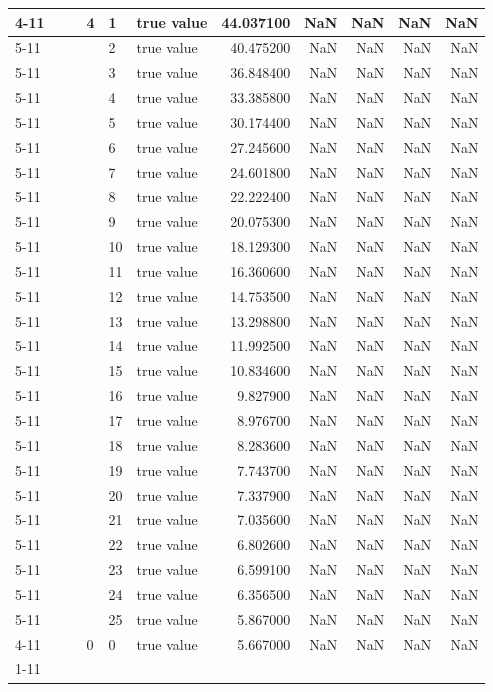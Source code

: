 \begin{tabular}{llllllrrrrr}
\cline{4-11} \cline{5-11}
 &  &  & \multirow[t]{25}{*}{4} & 1 & true value & 44.037100 & NaN & NaN & NaN & NaN \\
\cline{5-11}
 &  &  &  & 2 & true value & 40.475200 & NaN & NaN & NaN & NaN \\
\cline{5-11}
 &  &  &  & 3 & true value & 36.848400 & NaN & NaN & NaN & NaN \\
\cline{5-11}
 &  &  &  & 4 & true value & 33.385800 & NaN & NaN & NaN & NaN \\
\cline{5-11}
 &  &  &  & 5 & true value & 30.174400 & NaN & NaN & NaN & NaN \\
\cline{5-11}
 &  &  &  & 6 & true value & 27.245600 & NaN & NaN & NaN & NaN \\
\cline{5-11}
 &  &  &  & 7 & true value & 24.601800 & NaN & NaN & NaN & NaN \\
\cline{5-11}
 &  &  &  & 8 & true value & 22.222400 & NaN & NaN & NaN & NaN \\
\cline{5-11}
 &  &  &  & 9 & true value & 20.075300 & NaN & NaN & NaN & NaN \\
\cline{5-11}
 &  &  &  & 10 & true value & 18.129300 & NaN & NaN & NaN & NaN \\
\cline{5-11}
 &  &  &  & 11 & true value & 16.360600 & NaN & NaN & NaN & NaN \\
\cline{5-11}
 &  &  &  & 12 & true value & 14.753500 & NaN & NaN & NaN & NaN \\
\cline{5-11}
 &  &  &  & 13 & true value & 13.298800 & NaN & NaN & NaN & NaN \\
\cline{5-11}
 &  &  &  & 14 & true value & 11.992500 & NaN & NaN & NaN & NaN \\
\cline{5-11}
 &  &  &  & 15 & true value & 10.834600 & NaN & NaN & NaN & NaN \\
\cline{5-11}
 &  &  &  & 16 & true value & 9.827900 & NaN & NaN & NaN & NaN \\
\cline{5-11}
 &  &  &  & 17 & true value & 8.976700 & NaN & NaN & NaN & NaN \\
\cline{5-11}
 &  &  &  & 18 & true value & 8.283600 & NaN & NaN & NaN & NaN \\
\cline{5-11}
 &  &  &  & 19 & true value & 7.743700 & NaN & NaN & NaN & NaN \\
\cline{5-11}
 &  &  &  & 20 & true value & 7.337900 & NaN & NaN & NaN & NaN \\
\cline{5-11}
 &  &  &  & 21 & true value & 7.035600 & NaN & NaN & NaN & NaN \\
\cline{5-11}
 &  &  &  & 22 & true value & 6.802600 & NaN & NaN & NaN & NaN \\
\cline{5-11}
 &  &  &  & 23 & true value & 6.599100 & NaN & NaN & NaN & NaN \\
\cline{5-11}
 &  &  &  & 24 & true value & 6.356500 & NaN & NaN & NaN & NaN \\
\cline{5-11}
 &  &  &  & 25 & true value & 5.867000 & NaN & NaN & NaN & NaN \\
\cline{4-11} \cline{5-11}
 &  &  & 0 & 0 & true value & 5.667000 & NaN & NaN & NaN & NaN \\
\cline{1-11} \cline{2-11} \cline{3-11} \cline{4-11} \cline{5-11}
\bottomrule
\end{tabular}
